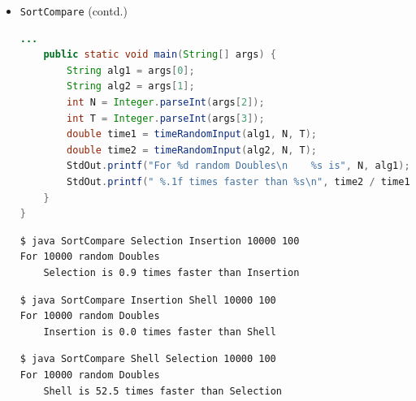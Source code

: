 \documentclass[8pt,a4paper,compress]{beamer}
\begin{document}
\begin{frame}[fragile]
\begin{itemize}
\item \lstinline{SortCompare} (contd.)
\begin{lstlisting}[language=Java]
    ...
    public static void main(String[] args) { 
        String alg1 = args[0]; 
        String alg2 = args[1]; 
        int N = Integer.parseInt(args[2]); 
        int T = Integer.parseInt(args[3]); 
        double time1 = timeRandomInput(alg1, N, T); 
        double time2 = timeRandomInput(alg2, N, T); 
        StdOut.printf("For %d random Doubles\n    %s is", N, alg1); 
        StdOut.printf(" %.1f times faster than %s\n", time2 / time1, alg2); 
    } 
}
\end{lstlisting}

\begin{lstlisting}[language={}]
$ java SortCompare Selection Insertion 10000 100
For 10000 random Doubles
    Selection is 0.9 times faster than Insertion
\end{lstlisting}

\begin{lstlisting}[language={}]
$ java SortCompare Insertion Shell 10000 100
For 10000 random Doubles
    Insertion is 0.0 times faster than Shell
\end{lstlisting}

\begin{lstlisting}[language={}]
$ java SortCompare Shell Selection 10000 100
For 10000 random Doubles
    Shell is 52.5 times faster than Selection
\end{lstlisting}
\end{itemize}
\end{frame}
\end{document}
